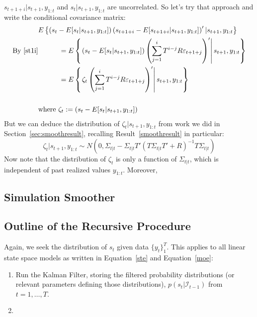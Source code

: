 \documentclass[a4paper,12pt]{article}
\begin{document}
\begin{enumerate}
    $s_{t+1+i}|s_{t+1},y_{1:t}$ and $s_t|s_{t+1},y_{1:t}$ are
    uncorrelated.  So let's try that approach and write the
    conditional covariance matrix:
    \begin{align*}
      &E\left\{
        \left(s_t - E[s_t|s_{t+1},y_{1:t}]\right) 
        \left(s_{t+1+i} - E[s_{t+1+i}|s_{t+1},y_{1:t}]\right)'
        | s_{t+1},y_{1:t}
      \right\}  \\
      \text{By~\ref{st1i}} 
      &\quad\qquad =
      E\left\{\left.
        \left(s_t - E[s_t|s_{t+1},y_{1:t}]\right) 
        \left(\sum^i_{j=1} T^{i-j} R \varepsilon_{t+1+j}\right)'
        \right\rvert s_{t+1},y_{1:t} 
      \right\}  \\
      &\quad\qquad =
      E\left\{\left.
        \zeta_t
        \left(\sum^i_{j=1} T^{i-j} R \varepsilon_{t+1+j}\right)'
        \right\rvert s_{t+1},y_{1:t} 
      \right\} \\\\
      &\text{where } 
      \zeta_t :=  \left(s_t - E[s_t|s_{t+1},y_{1:t}]\right) 
    \end{align*} 
    But we can deduce the distribution of $\zeta_t | s_{t+1}, y_{1:t}$
    from work we did in Section~\ref{sec:smoothresult}, recalling
    Result~\ref{smoothresult} in particular: 
    \begin{equation}
      \zeta_t| s_{t+1}, y_{1:t}\sim 
      N(0, \Sigma_{t|t} - \Sigma_{t|t}T'
           \left(T\Sigma_{t|t} T'+R\right)^{-1} T\Sigma_{t|t})
    \end{equation}
    Now note that the distribution of $\zeta_t$ is only a function of
    $\Sigma_{t|t}$, which is independent of past realized values
    $y_{1:t}$. Moreover, 

\end{enumerate}







\subsection{Simulation Smoother}



\subsection{Outline of the Recursive Procedure}

Again, we seek the distribution of $s_t$ given data $\{y_t\}^T_1$. This
applies to all linear state space models as written in
Equation~\ref{ste} and Equation~\ref{moe}:
\begin{enumerate}
  \item Run the Kalman Filter, storing the filtered
    probability distributions (or relevant parameters
    defining those distributions),
    $p(s_t|\mathcal{I}_{t-1})$ from $t=1,\ldots,T$.
  \item 
\end{enumerate}
\end{document}
